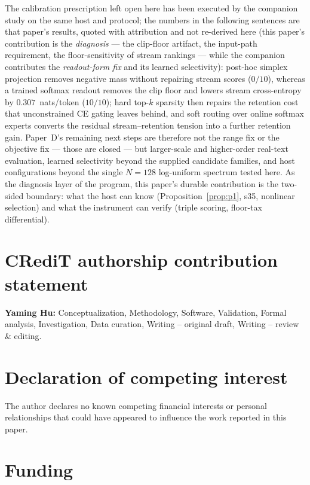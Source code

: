 \documentclass[preprint,12pt]{elsarticle}
\begin{document}
The calibration prescription left open here has been executed by the
companion study \cite{redemf} on the same host and protocol; the numbers
in the following sentences are that paper's results, quoted with
attribution and not re-derived here (this paper's contribution is the
\emph{diagnosis} --- the clip-floor artifact, the input-path
requirement, the floor-sensitivity of stream rankings --- while the
companion contributes the \emph{readout-form fix} and its learned
selectivity):
post-hoc simplex projection removes negative mass without repairing
stream scores ($0/10$), whereas a trained softmax readout removes the
clip floor and lowers stream cross-entropy by $0.307$~nats/token
($10/10$); hard top-$k$ sparsity then repairs the retention cost that
unconstrained CE gating leaves behind, and soft routing over online
softmax experts converts the residual stream--retention tension into a
further retention gain. Paper~D's remaining next steps are therefore
not the range fix or the objective fix --- those are closed --- but
larger-scale and higher-order real-text evaluation, learned
selectivity beyond the supplied candidate families, and host
configurations beyond the single $N=128$ log-uniform spectrum tested
here. As the diagnosis layer of the program, this paper's durable
contribution is the two-sided boundary: what the host can know
(Proposition~\ref{prop:p1}, s35, nonlinear selection) and what the
instrument can verify (triple scoring, floor-tax differential).

\section*{CRediT authorship contribution statement}

\textbf{Yaming Hu:} Conceptualization, Methodology, Software,
Validation, Formal analysis, Investigation, Data curation,
Writing -- original draft, Writing -- review \& editing.

\section*{Declaration of competing interest}

The author declares no known competing financial interests or personal
relationships that could have appeared to influence the work reported in
this paper.

\section*{Funding}
\end{document}
